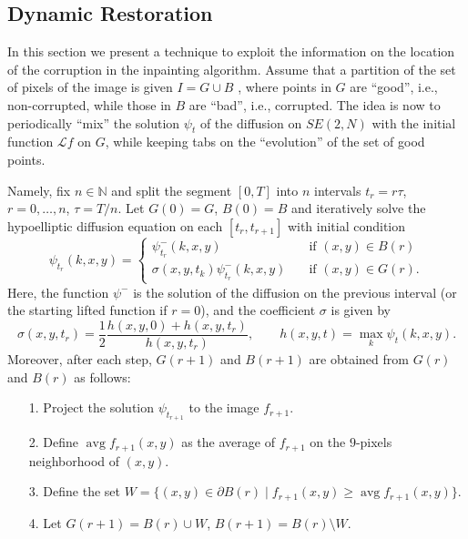 \documentclass[proc]{edpsmath}
\begin{document}
\subsection{Dynamic Restoration}

In this section we present a technique to exploit the information on the location of the corruption in the inpainting algorithm. Assume that a partition of the set of pixels of the image is given $I = G \cup B$ , where points in $G$ are ``good'', i.e., non-corrupted, while those in $B$ are ``bad'', i.e., corrupted. The idea is now to periodically ``mix'' the solution $\psi_t$ of the diffusion on $SE(2,N)$ with the initial function $\mathcal Lf$ on $G$, while keeping tabs on the ``evolution'' of the set of good points.

Namely, fix $n\in{\mathbb N}$ and split the segment $[0,T]$ into $n$ intervals $t_r=r\tau$, $r=0,\ldots,n$, $\tau=T/n$. Let $G(0)=G$, $B(0)=B$ and iteratively solve  the hypoelliptic diffusion equation on each $[t_r,t_{r+1}]$ with initial condition
\begin{equation}
  \psi_{t_r}(k,x,y)=
  \begin{cases}
    \psi^-_{t_r}(k,x,y)& \quad\text{if } (x,y)\in B(r)\\
    \sigma(x,y,t_k)\psi^-_{t_r}(k,x,y)& \quad\text{if } (x,y)\in G(r).
  \end{cases}
\end{equation}
Here, the function $\psi^-$ is the solution of the diffusion on the previous interval (or the starting lifted function if $r=0$), and the coefficient $\sigma$ is given by
\begin{equation}
  \sigma(x,y,t_r)=\frac12 \frac{h(x,y,0)+h(x,y,t_r)}{h(x,y,t_r)}, \qquad h(x,y,t) = \max_k \psi_t(k,x,y).
\end{equation}
Moreover, after each step, $G(r+1)$ and $B(r+1)$ are obtained from $G(r)$ and $B(r)$ as follows:
\begin{enumerate}
  \item[1.] Project the solution $\psi_{t_{r+1}}$ to the image $f_{r+1}$.
  \item[2.] Define $\operatorname{avg}f_{r+1}(x,y)$ as the average of $f_{r+1}$ on the $9$-pixels neighborhood of $(x,y)$.
  \item[3.] Define the set $W = \{(x,y)\in\partial B(r) \mid  f_{r+1}(x,y)\ge \operatorname{avg}f_{r+1}(x,y) \}$.
  \item[4.] Let $G(r+1) = B(r)\cup W$, $B(r+1)=B(r)\setminus W$.
\end{enumerate}
\end{document}
